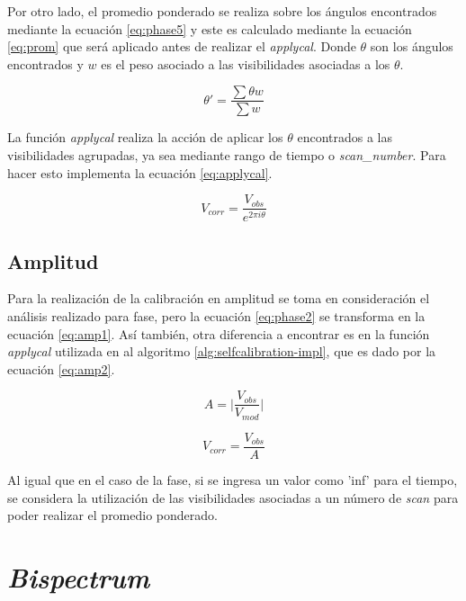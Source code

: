 Por otro lado, el promedio ponderado se realiza sobre los ángulos encontrados mediante la ecuación \ref{eq:phase5} y este es calculado mediante la ecuación \ref{eq:prom} que será aplicado antes de realizar el \textit{applycal}. Donde $\theta$ son los ángulos encontrados y $w$ es el peso asociado a las visibilidades asociadas a los $\theta$.

\begin{equation}
    \theta' = \frac{\sum \theta w}{\sum w}
    \label{eq:prom}
\end{equation}

La función \textit{applycal} realiza la acción de aplicar los $\theta$ encontrados a las visibilidades agrupadas, ya sea mediante rango de tiempo o \textit{scan\_number}. Para hacer esto implementa la ecuación \ref{eq:applycal}.

\begin{equation}
    V_{corr} = \frac{V_{obs}}{e^{2 \pi i \theta}}
    \label{eq:applycal}
\end{equation}

\subsection{Amplitud}

Para la realización de la calibración en amplitud se toma en consideración el análisis realizado para fase, pero la ecuación \ref{eq:phase2} se transforma en la ecuación \ref{eq:amp1}. Así también, otra diferencia a encontrar es en la función \textit{applycal} utilizada en al algoritmo \ref{alg:selfcalibration-impl}, que es dado por la ecuación \ref{eq:amp2}.

\begin{equation}
    A = \bigg|\frac{V_{obs}}{V_{mod}}\bigg| 
    \label{eq:amp1}
\end{equation}

\begin{equation}
    V_{corr} = \frac{V_{obs}}{A}
    \label{eq:amp2}
\end{equation}

Al igual que en el caso de la fase, si se ingresa un valor como 'inf' para el tiempo, se considera la utilización de las visibilidades asociadas a un número de \textit{scan} para poder realizar el promedio ponderado. 

\section{\textit{Bispectrum}}
\label{sec:bispectrum}

